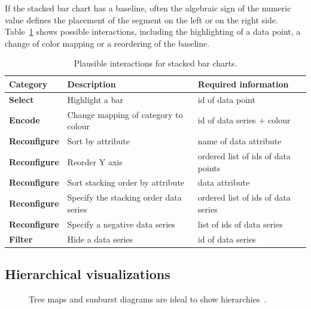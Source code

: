 If the stacked bar chart has a baseline, often the algebraic sign of the numeric value defines the placement of the segment on the left or on the right side.
Table~\ref{tab:analysis:stacked-bar-chart:interactions} shows possible interactions, including the highlighting of a data point, a change of color mapping or a reordering of the baseline.

\begin{table}[H]
  \caption{Plausible interactions for stacked bar charts.}%
  \label{tab:analysis:stacked-bar-chart:interactions}
  \begin{tabular*}{\textwidth}{lll}
    \bf Category & \bf Description & \bf Required information \\
    \hline
    \bf Select & Highlight a bar & id of data point \\
    \bf Encode & Change mapping of category to colour & id of data series + colour \\
    \bf Reconfigure & Sort by attribute & name of data attribute \\
    \bf Reconfigure & Reorder Y axis & ordered list of ids of data points \\
    \bf Reconfigure & Sort stacking order by attribute & data attribute \\
    \bf Reconfigure & Specify the stacking order data series & ordered list of ids of data series \\
    \bf Reconfigure & Specify a negative data series & list of ids of data series \\
    \bf Filter & Hide a data series & id of data series \\
  \end{tabular*}
\end{table}


\subsection{Hierarchical visualizations}

\begin{figure}
  \centering
  \qquad
  \caption{Tree maps and sunburst diagrams are ideal to show hierarchies~\parencite{VisualizationCatalogue2017}.}%
  \label{fig:analysis:hierarchies}
\end{figure}

